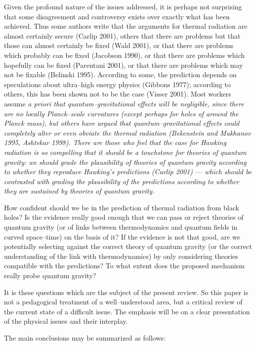 Given the profound nature of the issues addressed, it is perhaps not surprising
that some disagreement and controversy exists over exactly what has been
achieved.  Thus some authors write that the arguments for thermal radiation are
almost certainly secure (Carlip 2001),  others that there are problems but that
those can almost certainly be fixed (Wald 2001), or that there are problems
which probably can be fixed (Jacobson 1990), or that there are problems which
hopefully can be fixed (Parentani 2001), or that there are problems which may
not be fixable (Belinski 1995).   According to some, the prediction depends on
speculations about ultra--high energy physics (Gibbons 1977); according to
others, this has been shown not to be the case (Visser 2001).  Most workers
assume \it a priori \rm that quantum--gravitational effects will be negligible,
since there are no locally Planck--scale curvatures (except perhaps for holes
of around the Planck mass), but others have argued that quantum--gravitational
effects could completely alter or even obviate the thermal radiation
(Bekenstein and Mukhanov 1995, Ashtekar 1998).  There are those who feel that
the case for Hawking radiation  is so compelling that it should be a touchstone
for theories of quantum gravity: we should grade the plausibility of theories
of quantum gravity according to whether they reproduce Hawking's predictions
(Carlip 2001) --- which should be contrasted with grading the plausibility of
the predictions according to whether they are sustained by theories of quantum
gravity.

How confident should we be in the prediction of thermal radiation from black
holes?  Is the evidence really good enough that we can pass or reject theories
of quantum gravity (or of links between thermodynamics and quantum fields in
curved space--time) on the basis of it?  If the evidence is not that good, are
we potentially selecting against the correct theory of quantum gravity (or the
correct understanding of the link with thermodynamics) by only considering
theories compatible with the predictions? To what extent does the proposed
mechanism really probe quantum gravity?  

It is these questions which are the subject of the present review.  So this
paper is not a pedagogical treatment of a well--understood area, but a
critical review of the current state of a difficult issue.  The emphasis will be
on a clear presentation of the physical issues and their interplay.
 
The main conclusions may be summarized as follows:

